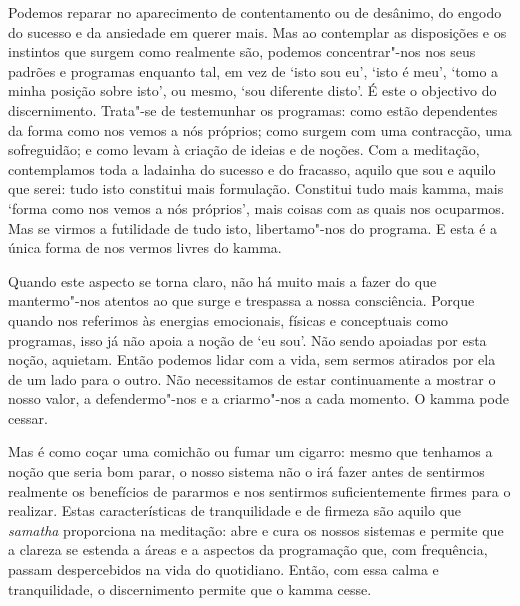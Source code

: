 Podemos reparar no aparecimento de contentamento ou de desânimo, do engodo do
sucesso e da ansiedade em querer mais. Mas ao contemplar as disposições e os
instintos que surgem como realmente são, podemos concentrar"-nos nos seus padrões
e programas enquanto tal, em vez de `isto sou eu', `isto é meu', `tomo a minha
posição sobre isto', ou mesmo, `sou diferente disto'. É este o objectivo do
discernimento. Trata"-se de testemunhar os programas: como estão dependentes da
forma como nos vemos a nós próprios; como surgem com uma contracção, uma
sofreguidão; e como levam à criação de ideias e de noções. Com a meditação,
contemplamos toda a ladainha do sucesso e do fracasso, aquilo que sou e aquilo
que serei: tudo isto constitui mais formulação. Constitui tudo mais kamma, mais
`forma como nos vemos a nós próprios', mais coisas com as quais nos ocuparmos.
Mas se virmos a futilidade de tudo isto, libertamo"-nos do programa. E esta é a
única forma de nos vermos livres do kamma.

Quando este aspecto se torna claro, não há muito mais a fazer do que
mantermo"-nos atentos ao que surge e trespassa a nossa consciência. Porque quando
nos referimos às energias emocionais, físicas e conceptuais como programas, isso
já não apoia a noção de `eu sou'. Não sendo apoiadas por esta noção, aquietam.
Então podemos lidar com a vida, sem sermos atirados por ela de um lado para o
outro. Não necessitamos de estar continuamente a mostrar o nosso valor, a
defendermo"-nos e a criarmo"-nos a cada momento. O kamma pode cessar.

Mas é como coçar uma comichão ou fumar um cigarro: mesmo que tenhamos a noção
que seria bom parar, o nosso sistema não o irá fazer antes de sentirmos
realmente os benefícios de pararmos e nos sentirmos suficientemente firmes para
o realizar. Estas características de tranquilidade e de firmeza são aquilo que
\emph{samatha} proporciona na meditação: abre e cura os nossos sistemas e
permite que a clareza se estenda a áreas e a aspectos da programação que, com
frequência, passam despercebidos na vida do quotidiano. Então, com essa calma e
tranquilidade, o discernimento permite que o kamma cesse.
